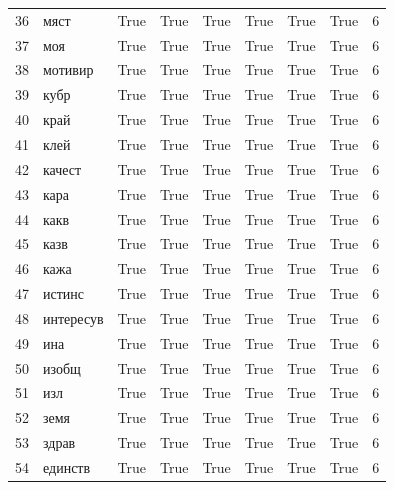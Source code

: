\begin{longtable}{rlllllllr}
  36 &        мяст &     True &   True &   True &       True &           True &      True &      6 \\
  37 &         моя &     True &   True &   True &       True &           True &      True &      6 \\
  38 &     мотивир &     True &   True &   True &       True &           True &      True &      6 \\
  39 &        кубр &     True &   True &   True &       True &           True &      True &      6 \\
  40 &        край &     True &   True &   True &       True &           True &      True &      6 \\
  41 &        клей &     True &   True &   True &       True &           True &      True &      6 \\
  42 &      качест &     True &   True &   True &       True &           True &      True &      6 \\
  43 &        кара &     True &   True &   True &       True &           True &      True &      6 \\
  44 &        какв &     True &   True &   True &       True &           True &      True &      6 \\
  45 &        казв &     True &   True &   True &       True &           True &      True &      6 \\
  46 &        кажа &     True &   True &   True &       True &           True &      True &      6 \\
  47 &      истинс &     True &   True &   True &       True &           True &      True &      6 \\
  48 &   интересув &     True &   True &   True &       True &           True &      True &      6 \\
  49 &         ина &     True &   True &   True &       True &           True &      True &      6 \\
  50 &       изобщ &     True &   True &   True &       True &           True &      True &      6 \\
  51 &         изл &     True &   True &   True &       True &           True &      True &      6 \\
  52 &        земя &     True &   True &   True &       True &           True &      True &      6 \\
  53 &       здрав &     True &   True &   True &       True &           True &      True &      6 \\
  54 &     единств &     True &   True &   True &       True &           True &      True &      6 \\

\end{longtable}
